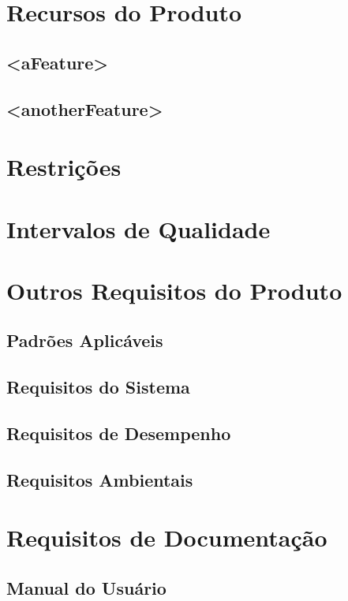 \section{Recursos do Produto}

\subsection{<aFeature>}

\subsection{<anotherFeature>}


\section{Restrições}

\section{Intervalos de Qualidade}

\section{Outros Requisitos do Produto}

\subsection{Padrões Aplicáveis}

\subsection{Requisitos do Sistema}

\subsection{Requisitos de Desempenho }

\subsection{Requisitos Ambientais}

\section{Requisitos de Documentação}

\subsection{Manual do Usuário}

